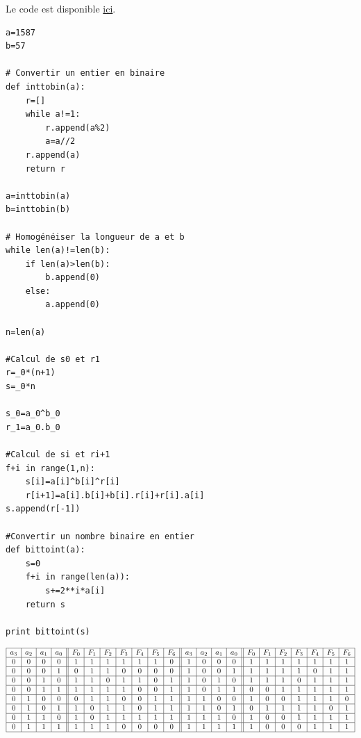 
Le code est disponible \href{https://github.com/Costadoat/S10/raw/master/TP01\%20Fonctions\%20combinatoires/Code/Calculatrice.py}{ici}.


\begin{verbatim}
a=1587
b=57

# Convertir un entier en binaire
def inttobin(a):
    r=[]
    while a!=1:
        r.append(a%2)
        a=a//2
    r.append(a)
    return r

a=inttobin(a)
b=inttobin(b)

# Homogénéiser la longueur de a et b
while len(a)!=len(b):
    if len(a)>len(b):
        b.append(0)
    else:
        a.append(0)

n=len(a)

#Calcul de s0 et r1
r=_0*(n+1)
s=_0*n

s_0=a_0^b_0
r_1=a_0.b_0

#Calcul de si et ri+1
f+i in range(1,n):
    s[i]=a[i]^b[i]^r[i]
    r[i+1]=a[i].b[i]+b[i].r[i]+r[i].a[i]
s.append(r[-1])

#Convertir un nombre binaire en entier
def bittoint(a):
    s=0
    f+i in range(len(a)):
        s+=2**i*a[i]
    return s

print bittoint(s)
\end{verbatim}


\begin{center}
$\begin{array}{|c|c|c|c||c|c|c|c|c|c|c||c|c|c|c||c|c|c|c|c|c|c|}
\hline
a_3 & a_2 & a_1 & a_0 & F_0 & F_1 & F_2 & F_3 & F_4 & F_5 & F_6 & a_3 & a_2 & a_1 & a_0 & F_0 & F_1 & F_2 & F_3 & F_4 & F_5 & F_6  \\
\hline
0 & 0 & 0 & 0 & 1 & 1 & 1 & 1 & 1 & 1 & 0 & 1 & 0 & 0 & 0 & 1 & 1 & 1 & 1 & 1 & 1 & 1 \\
\hline
0 & 0 & 0 & 1 & 0 & 1 & 1 & 0 & 0 & 0 & 0 & 1 & 0 & 0 & 1 & 1 & 1 & 1 & 1 & 0 & 1 & 1 \\
\hline
0 & 0 & 1 & 0 & 1 & 1 & 0 & 1 & 1 & 0 & 1 & 1 & 0 & 1 & 0 & 1 & 1 & 1 & 0 & 1 & 1 & 1 \\
\hline
0 & 0 & 1 & 1 & 1 & 1 & 1 & 1 & 0 & 0 & 1 & 1 & 0 & 1 & 1 & 0 & 0 & 1 & 1 & 1 & 1 & 1 \\
\hline
0 & 1 & 0 & 0 & 0 & 1 & 1 & 0 & 0 & 1 & 1 & 1 & 1 & 0 & 0 & 1 & 0 & 0 & 1 & 1 & 1 & 0 \\
\hline
0 & 1 & 0 & 1 & 1 & 0 & 1 & 1 & 0 & 1 & 1 & 1 & 1 & 0 & 1 & 0 & 1 & 1 & 1 & 1 & 0 & 1 \\
\hline
0 & 1 & 1 & 0 & 1 & 0 & 1 & 1 & 1 & 1 & 1 & 1 & 1 & 1 & 0 & 1 & 0 & 0 & 1 & 1 & 1 & 1 \\
\hline
0 & 1 & 1 & 1 & 1 & 1 & 1 & 0 & 0 & 0 & 0 & 1 & 1 & 1 & 1 & 1 & 0 & 0 & 0 & 1 & 1 & 1 \\
\hline
\end{array}$
\end{center}

